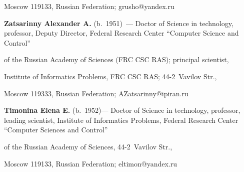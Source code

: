 Moscow 119133, Russian Federation; \mbox{grusho@yandex.ru}





\vspace*{3pt}   











\noindent


\textbf{Zatsarinny Alexander A.} (b.\ 1951)~--- Doctor of Science in technology, professor, Deputy Director, Federal Research Center ``Computer Science and Control''


 of the Russian Academy of Sciences (FRC CSC RAS); principal scientist, 


Institute of Informatics Problems, FRC CSC RAS; 44-2~Vavilov Str., 


Moscow 119333, Russian Federation; \mbox{AZatsarinny@ipiran.ru}








\vspace*{3pt}   





\noindent


\textbf{Timonina Elena E.} (b.\ 1952)--- Doctor of Science in technology, professor, leading scientist, Institute of Informatics Problems, Federal Research Center ``Computer Sciences and Control''


 of the Russian Academy of Sciences, 44-2~Vavilov Str., 


Moscow 119133, Russian Federation; \mbox{eltimon@yandex.ru}





        \label{end\stat}


        


        \renewcommand{\bibname}{\protect\rm Литература}  


